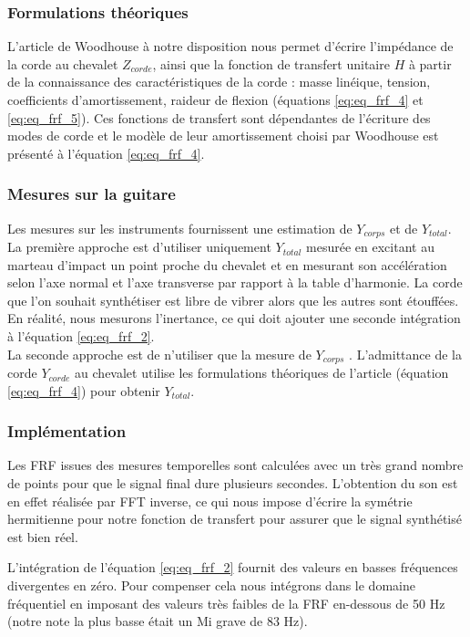 \subsubsection{Formulations théoriques}
L'article de Woodhouse à notre disposition nous permet d'écrire l'impédance
de la corde au chevalet $Z_{corde}$, ainsi que la fonction de transfert
unitaire $H$ à partir de la connaissance des caractéristiques de la corde :
masse linéique, tension, coefficients d'amortissement, raideur de flexion (équations \ref{eq:eq_frf_4} et \ref{eq:eq_frf_5}). Ces fonctions de transfert sont dépendantes de l'écriture des modes de corde et le modèle de leur amortissement choisi par Woodhouse est présenté à l'équation \ref{eq:eq_frf_4}.

\subsubsection{Mesures sur la guitare}
Les mesures sur les instruments fournissent une estimation de $Y_{corps}$ et de $Y_{total}$. \\

La première approche est d'utiliser uniquement $Y_{total}$ mesurée en
excitant au marteau d'impact un point proche du chevalet et en mesurant son accélération selon l'axe normal et l'axe transverse par rapport à la table
d'harmonie. La corde que l'on souhait synthétiser est libre de vibrer
alors que les autres sont étouffées. En réalité, nous mesurons l'inertance,
ce qui doit ajouter une seconde intégration à l'équation \ref{eq:eq_frf_2}.\\

La seconde approche est de n'utiliser que la mesure de $Y_{corps}$ .
L'admittance de la corde $Y_{corde}$ au chevalet utilise les formulations théoriques de l'article (équation \ref{eq:eq_frf_4}) pour obtenir $Y_{total}$. \\

\subsubsection{Implémentation}
Les FRF issues des mesures temporelles sont calculées avec un très grand nombre de points pour que le signal final dure plusieurs secondes. L'obtention du son est en effet réalisée par FFT inverse, ce qui nous impose d'écrire la symétrie hermitienne pour notre fonction de transfert pour assurer que le signal synthétisé est bien réel.

L'intégration de l'équation \ref{eq:eq_frf_2} fournit des valeurs en basses fréquences divergentes en zéro. Pour compenser cela nous intégrons dans le domaine fréquentiel en imposant des valeurs très faibles de la FRF en-dessous de 50 Hz (notre note la plus basse était un Mi grave de 83 Hz).


